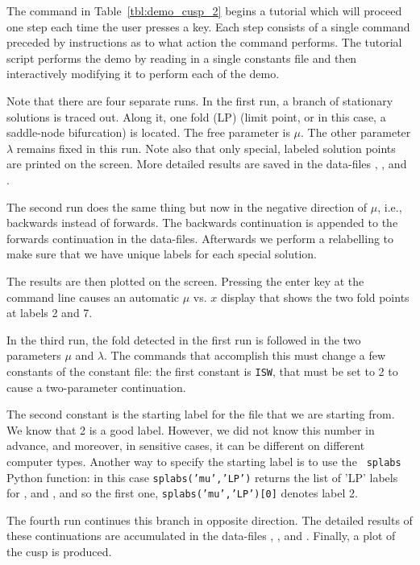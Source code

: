 \documentclass[12pt]{report}
\begin{document}
The command in Table~\ref{tbl:demo_cusp_2} begins
a tutorial which will proceed one step each time
the user presses a key.  Each step consists of a
single \AUTO command preceded by instructions as
to what action the command performs.
The tutorial script  performs the
demo by reading in a single \AUTO constants file
and then interactively modifying it to perform
each of the demo.

Note that there are four separate runs.
In the first run, a branch of stationary solutions is traced out.
Along it, one fold (LP) (limit point, or in this case, a saddle-node
bifurcation) is located. The free parameter is $\mu$.
The other parameter $\lambda$ remains fixed in this run.
Note also that only special, labeled solution points are printed on the screen.
More detailed results are saved 
in the data-files , , and .

The second run does the same thing but now in the negative direction
of $\mu$, i.e., backwards instead of forwards. The backwards
continuation is appended to the forwards continuation in the
data-files. Afterwards we perform a relabelling to make sure that we have
unique labels for each special solution.

The results are then plotted on the screen. Pressing the enter key
at the command line causes an automatic $\mu$ vs. $x$ display that
shows the two fold points at labels 2 and 7.

In the third run, the fold detected in the first run is followed in
the two parameters $\mu$ and $\lambda$. The commands that accomplish
this must change a few constants of the constant file: the first
constant is {\tt ISW}, that must be set to 2 to cause a two-parameter
continuation.

The second constant is the starting label for the file
 that we are starting from. We know that 2 is a good label.
However, we did not know this number in advance, and moreover,
in sensitive cases, it can be different on different computer types.
Another way to specify the starting label is to use the {\tt
  splabs} Python function: in this case {\tt splabs('mu','LP')}
returns the list of 'LP' labels for , and ,
and so the first one, {\tt splabs('mu','LP')[0]} denotes label 2.

The fourth run continues this branch in opposite direction.
The detailed results of these continuations are accumulated
in the data-files , , and . Finally, a plot of the cusp is produced.
\end{document}

